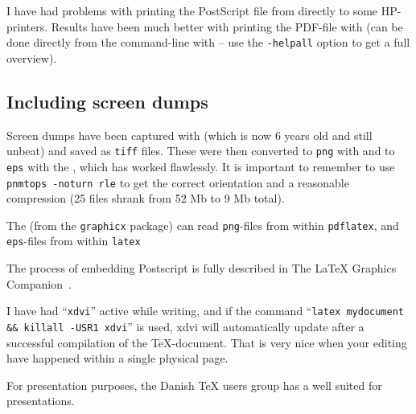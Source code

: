 I have had problems with printing the PostScript file from
 directly to some HP-printers.  Results have been
much better with printing the PDF-file with
 (can be done directly from the command-line with
 -- use the
\texttt{-helpall} option to get a full overview).


\subsection{Including screen dumps}
\label{sec:report-writing-tools-latex-eps}

Screen dumps have been captured with
(which is now 6 years old and still unbeat) and saved as \texttt{tiff}
files.  These were then converted to \texttt{png} with
 and to \texttt{eps} with the
, which has worked flawlessly.  It is important to remember
to use \texttt{pnmtops -noturn rle} to get the correct orientation and
a reasonable compression (25 files shrank from 52 Mb to 9 Mb total).

The  (from the \texttt{graphicx} package)
can read \texttt{png}-files from within \texttt{pdflatex}, and
\texttt{eps}-files from within \texttt{latex}


The process of embedding Postscript is fully described in The {\LaTeX}
Graphics
Companion~\cite{goosens-rahtz-mittelbach:the-latex-graphics-companion}.


I have had ``\texttt{xdvi}'' active while writing, and if the command
``\texttt{latex mydocument \&\& killall -USR1 xdvi}'' is used, xdvi
will automatically update after a successful compilation of the
TeX-document.  That is very nice when your editing have happened
within a single physical page.

For presentation purposes, the Danish TeX users group has a
 well suited for
presentations.

